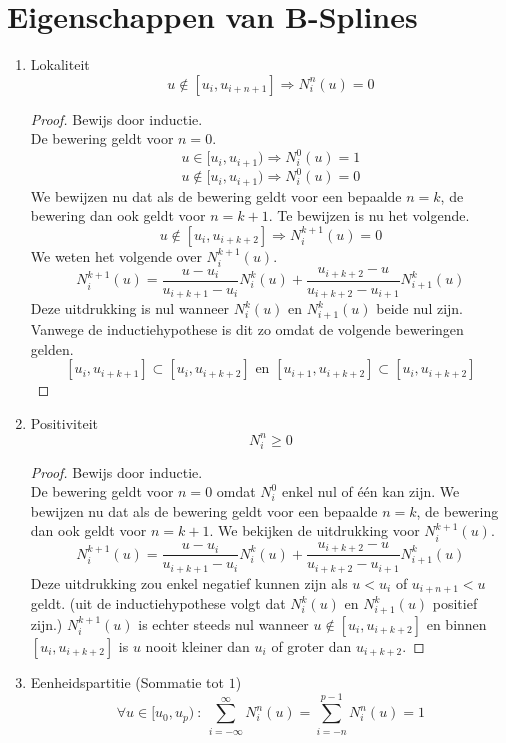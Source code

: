\documentclass[notities.tex]{subfiles}
\begin{document}
\section{Eigenschappen van B-Splines}
\begin{enumerate}
\item Lokaliteit
\[
u \not\in [u_i,u_{i+n+1}] \Rightarrow N_{i}^{n}(u) = 0
\]

\begin{proof} Bewijs door inductie.\\
De bewering geldt voor $n=0$.
\[
u \in [u_i,u_{i+1}) \Rightarrow N_{i}^{0}(u) = 1
\]
\[
u \not\in [u_i,u_{i+1}) \Rightarrow N_{i}^{0}(u) = 0
\]
We bewijzen nu dat als de bewering geldt voor een bepaalde $n=k$, de bewering dan ook geldt voor $n=k+1$.
Te bewijzen is nu het volgende.
\[
u \not\in [u_i,u_{i+k+2}] \Rightarrow N_{i}^{k+1}(u) = 0
\]
We weten het volgende over $N_{i}^{k+1}(u)$.
\[
N_{i}^{k+1}(u)
= \frac{u-u_i}{u_{i+k+1}-u_i}					N_{i}^{k}(u)
+ \frac{u_{i+k+2}-u}{u_{i+k+2}-u_{i+1}}			N_{i+1}^{k}(u)
\]
Deze uitdrukking is nul wanneer $N_{i}^{k}(u)$ en $N_{i+1}^{k}(u)$ beide nul zijn.
Vanwege de inductiehypothese is dit zo omdat de volgende beweringen gelden.
\[
[u_i,u_{i+k+1}] \subset [u_i,u_{i+k+2}]
\text{ en }
[u_{i+1},u_{i+k+2}] \subset [u_i,u_{i+k+2}]
\]
\end{proof}

\item Positiviteit
\[
N_{i}^{n} \ge 0
\]
\begin{proof} Bewijs door inductie.\\
De bewering geldt voor $n=0$ omdat $N_{i}^{0}$ enkel nul of \'e\'en kan zijn.
We bewijzen nu dat als de bewering geldt voor een bepaalde $n=k$, de bewering dan ook geldt voor $n=k+1$.
We bekijken de uitdrukking voor $N_{i}^{k+1}(u)$.
\[
N_{i}^{k+1}(u)
= \frac{u-u_i}{u_{i+k+1}-u_i}					N_{i}^{k}(u)
+ \frac{u_{i+k+2}-u}{u_{i+k+2}-u_{i+1}}			N_{i+1}^{k}(u)
\]
Deze uitdrukking zou enkel negatief kunnen zijn als $u < u_i$ of $u_{i+n+1} < u$ geldt. (uit de inductiehypothese volgt dat $N_{i}^{k}(u)$ en $N_{i+1}^{k}(u)$ positief zijn.)
$N_{i}^{k+1}(u)$ is echter steeds nul wanneer $u \not\in [u_i,u_{i+k+2}]$ en binnen $[u_i,u_{i+k+2}]$ is $u$ nooit kleiner dan $u_i$ of groter dan $u_{i+k+2}$.
\end{proof}

\item Eenheidspartitie (Sommatie tot $1$)
\[
\forall u \in [u_0,u_p)\ :\
\sum_{i=-\infty}^{\infty}N_{i}^{n}(u)
= \sum_{i=-n}^{p-1}N_{i}^{n}(u)
= 1
\]


\end{enumerate}
\end{document}
